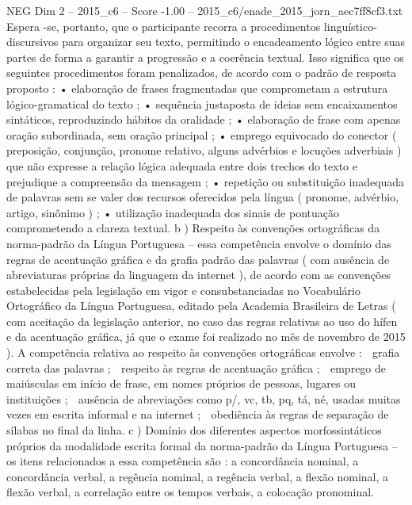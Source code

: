\begin{textsample}{NEG Dim 2 – 2015\_c6 – Score -1.00 – 2015\_c6/enade\_2015\_jorn\_aec7ff8cf3.txt}
Espera -se, portanto, que o participante recorra a procedimentos linguístico-discursivos para organizar seu texto, permitindo o encadeamento lógico entre suas partes de forma a garantir a progressão e a coerência textual.
Isso significa que os seguintes procedimentos foram penalizados, de acordo com o padrão de resposta proposto : • elaboração de frases fragmentadas que comprometam a estrutura lógico-gramatical do texto ; • sequência justaposta de ideias sem encaixamentos sintáticos, reproduzindo hábitos da oralidade ; • elaboração de frase com apenas oração subordinada, sem oração principal ; • emprego equivocado do conector ( preposição, conjunção, pronome relativo, alguns advérbios e locuções adverbiais ) que não expresse a relação lógica adequada entre dois trechos do texto e prejudique a compreensão da mensagem ; • repetição ou substituição inadequada de palavras sem se valer dos recursos oferecidos pela língua ( pronome, advérbio, artigo, sinônimo ) ; • utilização inadequada dos sinais de pontuação comprometendo a clareza textual. b ) Respeito às convenções ortográficas da norma-padrão da Língua Portuguesa – essa competência envolve o domínio das regras de acentuação gráfica e da grafia padrão das palavras ( com ausência de abreviaturas próprias da linguagem da internet ), de acordo com as convenções estabelecidas pela legislação em vigor e consubstanciadas no Vocabulário Ortográfico da Língua Portuguesa, editado pela Academia Brasileira de Letras ( com aceitação da legislação anterior, no caso das regras relativas ao uso do hífen e da acentuação gráfica, já que o exame foi realizado no mês de novembro de 2015 ).
A competência relativa ao respeito às convenções ortográficas envolve :  grafia correta das palavras ;  respeito às regras de acentuação gráfica ;  emprego de maiúsculas em início de frase, em nomes próprios de pessoas, lugares ou instituições ;  ausência de abreviações como p/, vc, tb, pq, tá, né, usadas muitas vezes em escrita informal e na internet ;  obediência às regras de separação de sílabas no final da linha. c ) Domínio dos diferentes aspectos morfossintáticos próprios da modalidade escrita formal da norma-padrão da Língua Portuguesa – os itens relacionados a essa competência são : a concordância nominal, a concordância verbal, a regência nominal, a regência verbal, a flexão nominal, a flexão verbal, a correlação entre os tempos verbais, a colocação pronominal.

\end{textsample}
